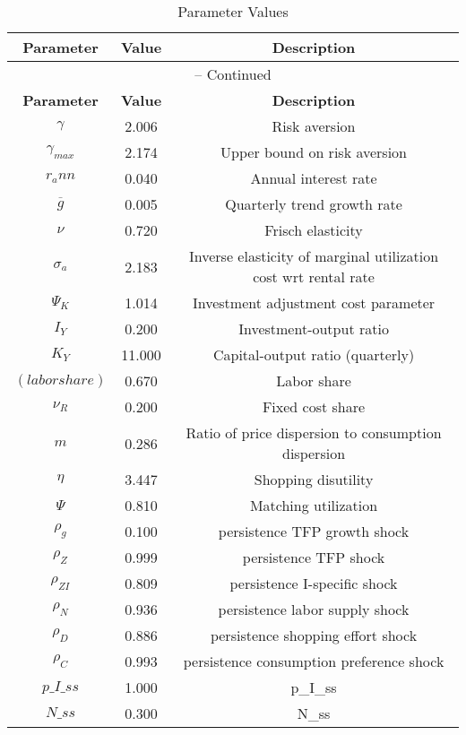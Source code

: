 \begin{center}
\begin{longtable}{ccc}
\caption{Parameter Values}\\%
\toprule%
\multicolumn{1}{c}{\textbf{Parameter}} &
\multicolumn{1}{c}{\textbf{Value}} &
 \multicolumn{1}{c}{\textbf{Description}}\\%
\midrule%
\endfirsthead
\multicolumn{3}{c}{{\tablename} \thetable{} -- Continued}\\%
\midrule%
\multicolumn{1}{c}{\textbf{Parameter}} &
\multicolumn{1}{c}{\textbf{Value}} &
  \multicolumn{1}{c}{\textbf{Description}}\\%
\midrule%
\endhead
${\gamma}$ 	 & 	 2.006 	 & 	 Risk aversion\\
${\gamma_{max}}$ 	 & 	 2.174 	 & 	 Upper bound on risk aversion\\
${r_ann}$ 	 & 	 0.040 	 & 	 Annual interest rate\\
${\overline{g}}$ 	 & 	 0.005 	 & 	 Quarterly trend growth rate\\
$\nu$ 	 & 	 0.720 	 & 	 Frisch elasticity\\
${\sigma_a}$ 	 & 	 2.183 	 & 	 Inverse elasticity of marginal utilization cost wrt rental rate\\
${\Psi_K}$ 	 & 	 1.014 	 & 	 Investment adjustment cost parameter\\
${I_Y}$ 	 & 	 0.200 	 & 	 Investment-output ratio\\
${K_Y}$ 	 & 	 11.000 	 & 	 Capital-output ratio (quarterly)\\
$(labor share)$ 	 & 	 0.670 	 & 	 Labor share\\
${\nu_R}$ 	 & 	 0.200 	 & 	 Fixed cost share\\
${m}$ 	 & 	 0.286 	 & 	 Ratio of price dispersion to consumption dispersion\\
${\eta}$ 	 & 	 3.447 	 & 	 Shopping disutility\\
${\Psi}$ 	 & 	 0.810 	 & 	 Matching utilization\\
${\rho_g}$ 	 & 	 0.100 	 & 	 persistence TFP growth shock\\
${\rho_Z}$ 	 & 	 0.999 	 & 	 persistence TFP shock\\
${\rho_{ZI}}$ 	 & 	 0.809 	 & 	 persistence I-specific shock\\
${\rho_N}$ 	 & 	 0.936 	 & 	 persistence labor supply shock\\
${\rho_D}$ 	 & 	 0.886 	 & 	 persistence shopping effort shock\\
${\rho_C}$ 	 & 	 0.993 	 & 	 persistence consumption preference shock\\
$p\_I\_ss$ 	 & 	 1.000 	 & 	 p\_I\_ss\\
$N\_ss$ 	 & 	 0.300 	 & 	 N\_ss\\
\bottomrule%
\end{longtable}
\end{center}
